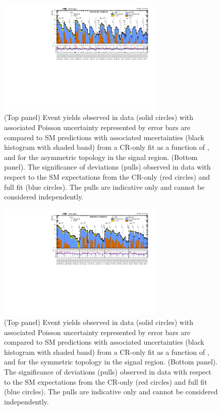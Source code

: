 \begin{figure}[!h]
  \begin{center}
    \includegraphics[angle=90,width=0.7\textwidth]{Figures/statisticalResults/summaryPlot_Asymmetric_prefit_overlay_fit_b}
    \caption{(Top panel) Event yields observed in data (solid circles) 
	with associated Poisson uncertainty represented by error bars 
	are compared to SM predictions with associated uncertainties (black
      histogram with shaded band) from a CR-only fit as a function of
      \njet, \nb and \scalht for the asymmetric topology in the
      signal region. (Bottom panel). The significance of deviations
      (pulls) observed in data with respect to the SM expectations
      from the CR-only (red circles) and full fit (blue circles). The
      pulls are indicative only and cannot be considered
      independently.}
    \label{fig:asym}
  \end{center}
\end{figure}

\begin{figure}[!h]
  \begin{center}
    \includegraphics[angle=90,width=0.7\textwidth]{Figures/statisticalResults/summaryPlot_Symmetric_prefit_overlay_fit_b}
    \caption{(Top panel) Event yields observed in data (solid circles) 
	with associated Poisson uncertainty represented by error bars 
	are compared to SM predictions with associated uncertainties (black
      histogram with shaded band) from a CR-only fit as a function of
      \njet, \nb and \scalht for the symmetric topology in the
      signal region. (Bottom panel). The significance of deviations
      (pulls) observed in data with respect to the SM expectations
      from the CR-only (red circles) and full fit (blue circles). The
      pulls are indicative only and cannot be considered
      independently.}
    \label{fig:sym}
  \end{center}
\end{figure}


